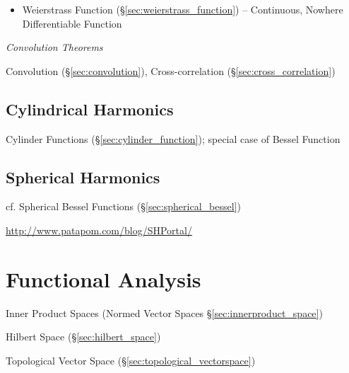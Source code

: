 \begin{itemize}
  \item Weierstrass Function (\S\ref{sec:weierstrass_function}) -- Continuous,
    Nowhere Differentiable Function
\end{itemize}


\emph{Convolution Theorems}

Convolution (\S\ref{sec:convolution}), Cross-correlation
(\S\ref{sec:cross_correlation})



\subsection{Cylindrical Harmonics}\label{sec:cylindrical_harmonics}

\fist Cylinder Functions (\S\ref{sec:cylinder_function}); special case of Bessel
Function



\subsection{Spherical Harmonics}\label{sec:spherical_harmonics}

\fist cf. Spherical Bessel Functions (\S\ref{sec:spherical_bessel})

\url{http://www.patapom.com/blog/SHPortal/}



\section{Functional Analysis}\label{sec:functional_analysis}

Inner Product Spaces (Normed Vector Spaces
\S\ref{sec:innerproduct_space})

Hilbert Space (\S\ref{sec:hilbert_space})

Topological Vector Space (\S\ref{sec:topological_vectorspace})



